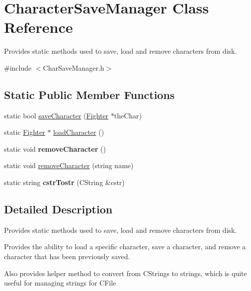 \hypertarget{class_character_save_manager}{}\section{Character\+Save\+Manager Class Reference}
\label{class_character_save_manager}


Provides static methods used to save, load and remove characters from disk.  




{\ttfamily \#include $<$Char\+Save\+Manager.\+h$>$}

\subsection*{Static Public Member Functions}
\begin{DoxyCompactItemize}
\item 
static bool \hyperlink{class_character_save_manager_a7e4ce04eed479a22b1d3f70c9fe06652}{save\+Character} (\hyperlink{class_fighter}{Fighter} $\ast$the\+Char)
\item 
static \hyperlink{class_fighter}{Fighter} $\ast$ \hyperlink{class_character_save_manager_a44105e8553b29cd7e37f3eec6f1a7ce7}{load\+Character} ()
\item 
\hypertarget{class_character_save_manager_af8ee3fecc5c19f1f61f98e9132a26b5f}{}\label{class_character_save_manager_af8ee3fecc5c19f1f61f98e9132a26b5f} 
static void {\bfseries remove\+Character} ()
\item 
static void \hyperlink{class_character_save_manager_a49dd1eedbdf0e2b7cedfba64d4fb8d53}{remove\+Character} (string name)
\item 
\hypertarget{class_character_save_manager_ad9adf9eda9b89e67a977167c954a8d7c}{}\label{class_character_save_manager_ad9adf9eda9b89e67a977167c954a8d7c} 
static string {\bfseries cstr\+Tostr} (C\+String \&cstr)
\end{DoxyCompactItemize}


\subsection{Detailed Description}
Provides static methods used to save, load and remove characters from disk. 

Provides the ability to load a specific character, save a character, and remove a character that has been previously saved. 

Also provides helper method to convert from C\+Strings to strings, which is quite useful for managing strings for C\+File 

